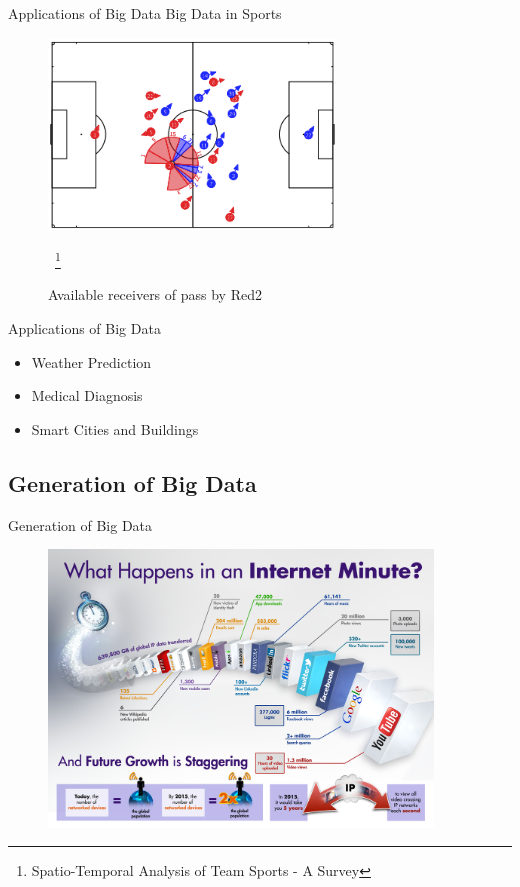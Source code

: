 \documentclass[pdf]{beamer}
\begin{document}
\begin{frame}[fragile]{Applications of Big Data}
Big Data in Sports~\cite{GudmundssonH16}
	 \begin{figure}[ht]
	    \begin{center}
        		\includegraphics[height=2in]{6.png}
		\caption{Available receivers of pass by Red2}
            ~\footnote{Spatio-Temporal Analysis of Team Sports - {A} Survey}
    \end{center}
    \end{figure}
\end{frame}
\begin{frame}[fragile]{Applications of Big Data}
\begin{itemize}
    \item Weather Prediction
    \item Medical Diagnosis
    \item Smart Cities and Buildings
 \end{itemize}	
\end{frame}

\subsection[Generation of Big Data]{Generation of Big Data}
\begin{frame}[fragile]{Generation of Big Data}
	 \begin{figure}[ht]
	    \begin{center}
        		\includegraphics[height=2.9in]{5.jpg}
    \end{center}
    \end{figure}
\end{frame}
\end{document}
